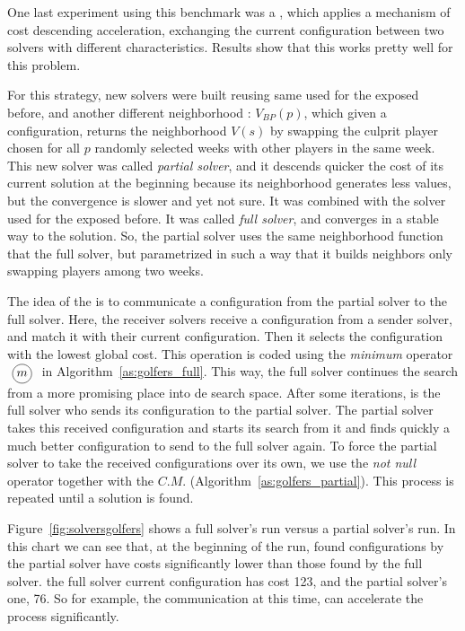 \separation

One last experiment using this benchmark was a \commstr{}, which applies a mechanism of cost descending acceleration, exchanging the current configuration between two solvers with different characteristics. Results show that this \commstr{} works pretty well for this problem.

For this strategy, new solvers were built reusing same \ms{} used for the \commstrs{} exposed before, and another different neighborhood \om{}: $V_{BP}(p)$, which given a configuration, returns the neighborhood $V\left(s\right)$ by swapping the culprit player chosen for all $p$ randomly selected weeks with other players in the same week. This new solver was called \textit{partial solver}, and it descends quicker the cost of its current solution at the beginning because its neighborhood generates less values, but the convergence is slower and yet not sure. It was combined with the solver used for the \commstrs{} exposed before. It was called \textit{full solver}, and converges in a stable way to the solution. So, the partial solver uses the same neighborhood function that the full solver, but parametrized in such a way that it builds neighbors only swapping players among two weeks. 

The idea of the \commstr{} is to communicate a configuration from the partial solver to the full solver. Here, the receiver solvers receive a configuration from a sender solver, and match it with their current configuration. Then it selects the configuration with the lowest global cost. This operation is coded using the \textit{minimum} operator $\poslop{m}$ in Algorithm~\ref{as:golfers_full}. This way, the full solver continues the search from a more promising place into de search space. After some iterations, is the full solver who sends its configuration to the partial solver. The partial solver takes this received configuration and starts its search from it and finds quickly a much better configuration to send to the full solver again. To force the partial solver to take the received configurations over its own, we use the \textit{not null} operator together with the \opch{} $C.M.$ (Algorithm~\ref{as:golfers_partial}). This process is repeated until a solution is found.

Figure~\ref{fig:solversgolfers} shows a full solver's run versus a partial solver's run. In this chart we can see that, at the beginning of the run, found configurations by the partial solver have costs significantly lower than those found by the full solver.  the full solver current configuration has cost 123, and the partial solver's one, 76. So for example, the communication at this time, can accelerate the process significantly.

